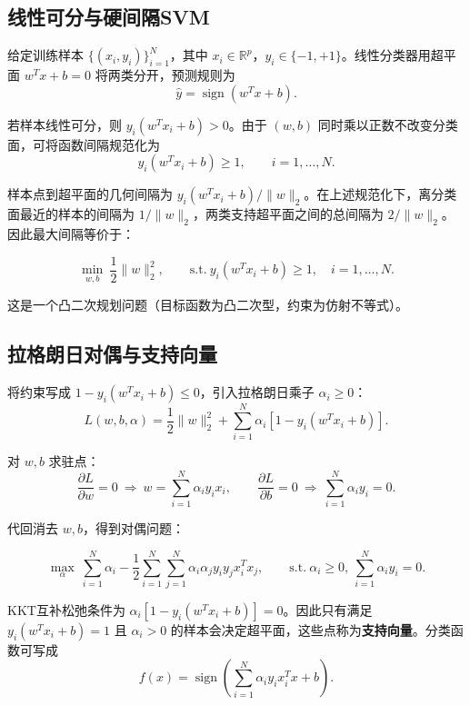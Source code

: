 \subsection{线性可分与硬间隔SVM}

给定训练样本 $\{(x_i, y_i)\}_{i=1}^{N}$，其中 $x_i \in \mathbb{R}^p$，$y_i \in \{-1, +1\}$。线性分类器用超平面 $w^T x + b = 0$ 将两类分开，预测规则为
\[
\hat{y} = \operatorname{sign}(w^T x + b).
\]

若样本线性可分，则 $y_i(w^T x_i + b) > 0$。由于 $(w, b)$ 同时乘以正数不改变分类面，可将函数间隔规范化为
\[
y_i(w^T x_i + b) \geq 1,\qquad i = 1, \ldots, N.
\]

样本点到超平面的几何间隔为 $y_i(w^T x_i + b) / \|w\|_2$。在上述规范化下，离分类面最近的样本的间隔为 $1/\|w\|_2$，两类支持超平面之间的总间隔为 $2/\|w\|_2$。因此最大间隔等价于：

\begin{definition}[硬间隔SVM]
\[
\min_{w, b}\ \frac{1}{2}\|w\|_2^2,\qquad
\text{s.t.}\ y_i(w^T x_i + b) \geq 1,\quad i = 1, \ldots, N.
\]
\end{definition}

这是一个凸二次规划问题（目标函数为凸二次型，约束为仿射不等式）。

\subsection{拉格朗日对偶与支持向量}

将约束写成 $1 - y_i(w^T x_i + b) \leq 0$，引入拉格朗日乘子 $\alpha_i \geq 0$：
\[
L(w, b, \alpha) = \frac{1}{2}\|w\|_2^2 + \sum_{i=1}^{N} \alpha_i [1 - y_i(w^T x_i + b)].
\]

对 $w, b$ 求驻点：
\[
\frac{\partial L}{\partial w} = 0 \ \Rightarrow\ w = \sum_{i=1}^{N} \alpha_i y_i x_i,\qquad
\frac{\partial L}{\partial b} = 0 \ \Rightarrow\ \sum_{i=1}^{N} \alpha_i y_i = 0.
\]

代回消去 $w, b$，得到对偶问题：

\begin{definition}[硬间隔SVM对偶]
\[
\max_{\alpha}\ \sum_{i=1}^{N} \alpha_i - \frac{1}{2}\sum_{i=1}^{N}\sum_{j=1}^{N} \alpha_i \alpha_j y_i y_j x_i^T x_j,\qquad
\text{s.t.}\ \alpha_i \geq 0,\ \sum_{i=1}^{N} \alpha_i y_i = 0.
\]
\end{definition}

KKT互补松弛条件为 $\alpha_i[1 - y_i(w^T x_i + b)] = 0$。因此只有满足 $y_i(w^T x_i + b) = 1$ 且 $\alpha_i > 0$ 的样本会决定超平面，这些点称为\textbf{支持向量}。分类函数可写成
\[
f(x) = \operatorname{sign}\!\left(\sum_{i=1}^{N} \alpha_i y_i x_i^T x + b\right).
\]

